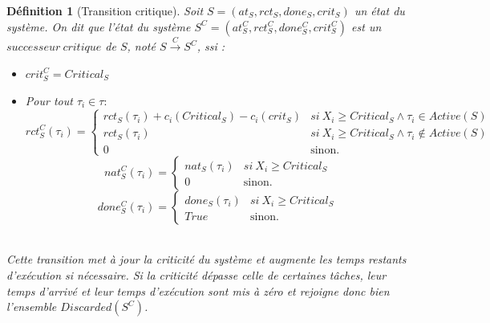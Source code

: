 \documentclass[11pt,a4paper,oneside]{book}
\theoremstyle{break}
\newtheorem{defin}{Définition}
\theoremstyle{breakplain}
\begin{document}
\begin{defin}[Transition critique]
\label{tcrit}
Soit $S = (at_S, rct_S, done_S, crit_S)$ un état du système. On dit que l'état du système $S^C = (at_S^C, rct_S^C, done_S^C, crit_S^C)$ est un $successeur\ critique$ de $S$, noté $S\xrightarrow{C}S^C$, ssi :
\begin{itemize}
\item $crit_S^C = Critical_S$
\item Pour tout $\tau_i \in \tau :$
$$ rct_S^C(\tau_i) = \left\{
    \begin{array}{ll}
        rct_S(\tau_i)+c_i(Critical_S)-c_i(crit_S) & si\ X_i\geq Critical_S \wedge \tau_i \in Active(S)\\
        rct_S(\tau_i) & si\ X_i\geq Critical_S \wedge \tau_i \notin Active(S)\\
        0 & \mbox{sinon.}
    \end{array}
\right.
$$
$$ nat_S^C(\tau_i) = \left\{
    \begin{array}{ll}
        nat_S(\tau_i) & si\ X_i\geq Critical_S \\
        0 & \mbox{sinon.}
    \end{array}
\right.
$$
$$ done_S^C(\tau_i) = \left\{
    \begin{array}{ll}
        done_S(\tau_i) & si\ X_i\geq Critical_S \\
        True & \mbox{sinon.}
    \end{array}
\right.
$$\\
\end{itemize}
Cette transition met à jour la criticité du système et augmente les temps restants d'exécution si nécessaire. Si la criticité dépasse celle de certaines tâches, leur temps d'arrivé et leur temps d'exécution sont mis à zéro et rejoigne donc bien l'ensemble $Discarded(S^C)$.
\end{defin}
\end{document}
